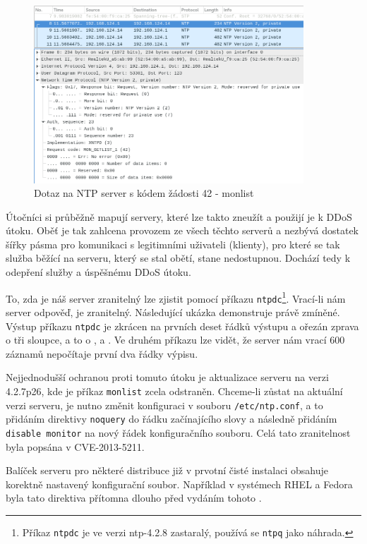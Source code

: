 \begin{figure} [ht]
	\centering
	\includegraphics[width=0.9\textwidth]{obrazky/mon_getlist_1_wireshark.png} %
	\caption{Dotaz na NTP server s kódem žádosti 42 - monlist}
	\label{fig:monlist_get_wireshark-img}
\end{figure}

Útočníci si průběžně mapují  servery, které lze takto zneužít a použijí je k 
DDoS útoku.
Oběť je tak zahlcena provozem ze všech těchto  serverů a nezbývá dostatek šířky
pásma pro komunikaci s legitimními uživateli (klienty), pro které se tak služba běžící na
serveru, který se stal obětí, stane nedostupnou. Dochází tedy k odepření služby a úspěšnému
DDoS útoku.

To, zda je náš server zranitelný lze zjistit pomocí příkazu \texttt{ntpdc}\footnote{Příkaz
\texttt{ntpdc} je ve verzi ntp-4.2.8 zastaralý, používá se \texttt{ntpq} jako náhrada.}.
Vrací-li nám server odpověď, je zranitelný. Následující ukázka demonstruje právě zmíněné.
Výstup příkazu \texttt{ntpdc} je zkrácen na prvních deset řádků výstupu a ořezán zprava o
tři sloupce, a to o ,  a . Ve druhém příkazu lze vidět, že
server nám vrací 600 záznamů nepočítaje první dva řádky výpisu.




Nejjednodušší ochranou proti tomuto útoku je aktualizace  serveru na verzi 4.2.7p26, kde
je příkaz \texttt{monlist} zcela odstraněn. Chceme-li zůstat na aktuální verzi  serveru,
je nutno změnit konfiguraci v souboru \texttt{/etc/ntp.conf}, a to přidáním direktivy
\texttt{noquery} do řádku začínajícího slovy  a následně přidáním
\texttt{disable monitor} na nový řádek konfiguračního souboru. 
Celá tato zranitelnost byla popsána v CVE-2013-5211. %

Balíček  serveru pro některé distribuce již v prvotní čisté instalaci obsahuje korektně
nastavený konfigurační soubor. Například v systémech RHEL a Fedora byla tato direktiva
přítomna dlouho před vydáním tohoto . %
